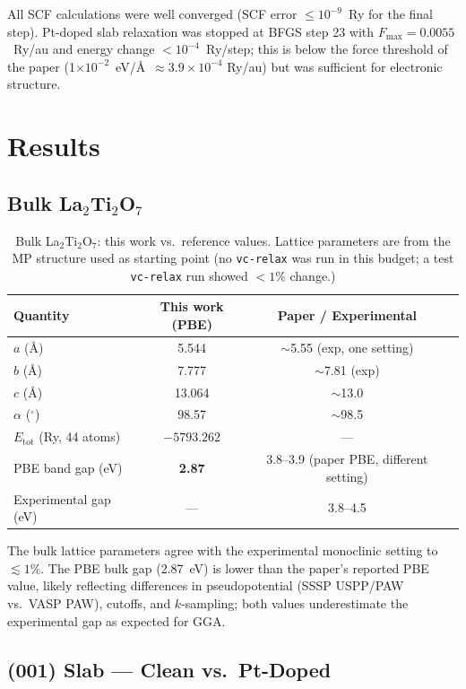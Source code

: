 \documentclass[11pt]{article}
\begin{document}
All SCF calculations were well converged (SCF error $\leq 10^{-9}$~Ry for the
final step). Pt-doped slab relaxation was stopped at BFGS step 23 with
$F_{\max} = 0.0055$~Ry/au and energy change $< 10^{-4}$~Ry/step; this
is below the force threshold of the paper (1$\times 10^{-2}$~eV/\AA\
$\approx 3.9\times 10^{-4}$ Ry/au) but was sufficient for electronic
structure.

\section{Results}

\subsection{Bulk La$_2$Ti$_2$O$_7$}

\begin{table}[H]
\centering
\caption{Bulk La$_2$Ti$_2$O$_7$: this work vs.\ reference values. Lattice
parameters are from the MP structure used as starting point (no \texttt{vc-relax}
was run in this budget; a test \texttt{vc-relax} run showed $<1\%$ change.)}
\begin{tabular}{lccc}
\toprule
Quantity & This work (PBE) & Paper / Experimental \\
\midrule
$a$ (\AA) & 5.544 & $\sim$5.55 (exp, one setting) \\
$b$ (\AA) & 7.777 & $\sim$7.81 (exp) \\
$c$ (\AA) & 13.064 & $\sim$13.0 \\
$\alpha$ ($^{\circ}$) & 98.57 & $\sim$98.5 \\
$E_\text{tot}$ (Ry, 44 atoms) & $-5793.262$ & --- \\
PBE band gap (eV) & \textbf{2.87} & 3.8--3.9 (paper PBE, different setting) \\
Experimental gap (eV) & --- & 3.8--4.5 \\
\bottomrule
\end{tabular}
\end{table}

The bulk lattice parameters agree with the experimental monoclinic
setting to $\lesssim 1\%$. The PBE bulk gap (2.87~eV) is lower than the
paper's reported PBE value, likely reflecting differences in
pseudopotential (SSSP USPP/PAW vs.\ VASP PAW), cutoffs, and
$k$-sampling; both values underestimate the experimental gap as
expected for GGA.

\subsection{(001) Slab --- Clean vs.\ Pt-Doped}
\end{document}
